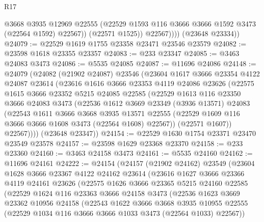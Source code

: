 \begin{lexlean}{R17}
\begin{coremodule}
                  @3668
                  @3935
                  @12969
                  @22555
                  (@22529 @1593 @116 @3666 @3666 @1592 @3473 (@22564 @1592) @22567))
                (@22571 @1525))
              @22567))))
      (@23648 @23334))
@24079 := @22529 @1619 @1755 @23358 @23471 @23546 @23579
@24082 := @23598 @1618 @23355 @23357
@24083 := @233 @23347
@24085 := @3463 @24083 @3473
@24086 := @5535 @24085
@24087 := @11696 @24086
@24148 := @24079
    (@24082
      (@21902 @24087)
      @23546
      (@23604
        @1617
        @3666
        @23354
        @4122
        @24087
        @23614
        (@23616
          @1616
          @3666
          @23353
          @4119
          @24086
          @23626
          (@22575
            @1615
            @3666
            @23352
            @5215
            @24085
            @22585
            (@22529
              @1613
              @116
              @23350
              @3666
              @24083
              @3473
              (@22536
                @1612
                @3669
                @23349
                (@3936 @13571)
                @24083
                (@22543
                  @1611
                  @3666
                  @3668
                  @3935
                  @13571
                  @22555
                  (@22529 @1609 @116 @3666 @3666 @1608 @3473 (@22564 @1608) @22567))
                (@22571 @1607))
              @22567))))
      (@23648 @23347))
@24154 := @22529 @1630 @1754 @23371 @23470 @23549 @23578
@24157 := @23598 @1629 @23368 @23370
@24158 := @233 @23360
@24160 := @3463 @24158 @3473
@24161 := @5535 @24160
@24162 := @11696 @24161
@24222 := @24154
    (@24157
      (@21902 @24162)
      @23549
      (@23604
        @1628
        @3666
        @23367
        @4122
        @24162
        @23614
        (@23616
          @1627
          @3666
          @23366
          @4119
          @24161
          @23626
          (@22575
            @1626
            @3666
            @23365
            @5215
            @24160
            @22585
            (@22529
              @1624
              @116
              @23363
              @3666
              @24158
              @3473
              (@22536
                @1623
                @3669
                @23362
                @10956
                @24158
                (@22543
                  @1622
                  @3666
                  @3668
                  @3935
                  @10955
                  @22555
                  (@22529 @1034 @116 @3666 @3666 @1033 @3473 (@22564 @1033) @22567))

\end{coremodule}
\end{lexlean}
